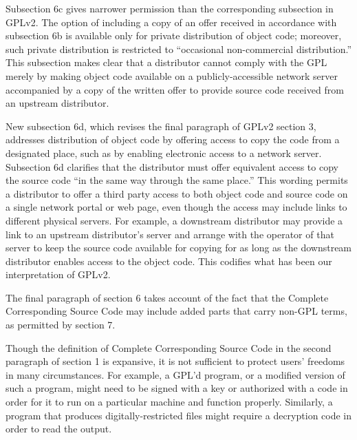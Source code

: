 
Subsection 6c gives narrower permission than the corresponding subsection in
GPLv2.  The option of including a copy of an offer received in accordance
with subsection 6b is available only for private distribution of object code;
moreover, such private distribution is restricted to ``occasional
non-commercial distribution.''  This subsection makes clear that a
distributor cannot comply with the GPL merely by making object code available
on a publicly-accessible network server accompanied by a copy of the written
offer to provide source code received from an upstream distributor.


New subsection 6d, which revises the final paragraph of GPLv2 section 3,
addresses distribution of object code by offering access to copy the code
from a designated place, such as by enabling electronic access to a network
server.  Subsection 6d clarifies that the distributor must offer equivalent
access to copy the source code ``in the same way through the same place.''
This wording permits a distributor to offer a third party access to both
object code and source code on a single network portal or web page, even
though the access may include links to different physical servers.  For
example, a downstream distributor may provide a link to an upstream
distributor's server and arrange with the operator of that server to keep the
source code available for copying for as long as the downstream distributor
enables access to the object code.  This codifies what has been our
interpretation of GPLv2.




The final paragraph of section 6 takes account of the fact that the Complete
Corresponding Source Code may include added parts that carry non-GPL terms,
as permitted by section 7.


Though the definition of Complete Corresponding Source Code in the second
paragraph of section 1 is expansive, it is not sufficient to protect users'
freedoms in many circumstances. For example, a GPL'd program, or a modified
version of such a program, might need to be signed with a key or authorized
with a code in order for it to run on a particular machine and function
properly. Similarly, a program that produces digitally-restricted files might
require a decryption code in order to read the output.

